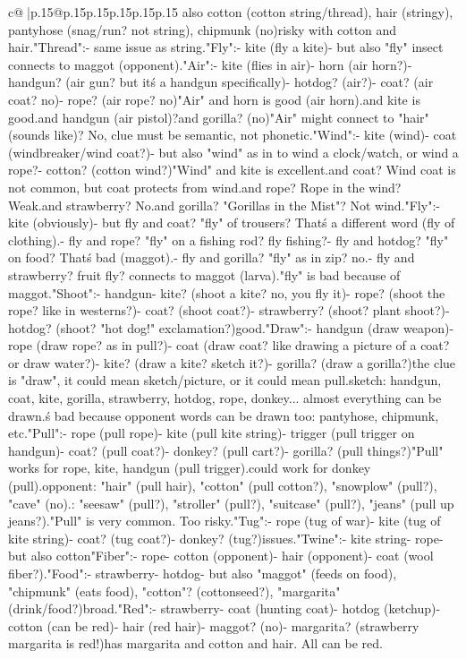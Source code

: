 \documentclass{article}
\begin{document}
{\begin{supertabular}{c@{$\;$}|p{.15\linewidth}@{}p{.15\linewidth}p{.15\linewidth}p{.15\linewidth}p{.15\linewidth}p{.15\linewidth}}
{{{also cotton (cotton string/thread), hair (stringy), pantyhose (snag/run? not string), chipmunk (no)\nToo risky with cotton and hair.\n\n"Thread":\n- same issue as string.\n\n"Fly":\n- kite (fly a kite)\n- but also "fly" insect connects to maggot (opponent).\n\n"Air":\n- kite (flies in air)\n- horn (air horn?)\n- handgun? (air gun? but it\'s a handgun specifically)\n- hotdog? (air?)\n- coat? (air coat? no)\n- rope? (air rope? no)\n"Air" and horn is good (air horn).\nAir and kite is good.\nAir and handgun (air pistol)?\nAir and gorilla? (no)\n"Air" might connect to "hair" (sounds like)? No, clue must be semantic, not phonetic.\n\n"Wind":\n- kite (wind)\n- coat (windbreaker/wind coat?)\n- but also "wind" as in to wind a clock/watch, or wind a rope?\n- cotton? (cotton wind?)\n"Wind" and kite is excellent.\nWind and coat? Wind coat is not common, but coat protects from wind.\nWind and rope? Rope in the wind? Weak.\nWind and strawberry? No.\nWind and gorilla? "Gorillas in the Mist"? Not wind.\n\n"Fly":\n- kite (obviously)\n- but fly and coat? "fly" of trousers? That\'s a different word (fly of clothing).\n- fly and rope? "fly" on a fishing rod? fly fishing?\n- fly and hotdog? "fly" on food? That\'s bad (maggot).\n- fly and gorilla? "fly" as in zip? no.\n- fly and strawberry? fruit fly? connects to maggot (larva).\nSo "fly" is bad because of maggot.\n\n"Shoot":\n- handgun\n- kite? (shoot a kite? no, you fly it)\n- rope? (shoot the rope? like in westerns?)\n- coat? (shoot coat?)\n- strawberry? (shoot? plant shoot?)\n- hotdog? (shoot? "hot dog!" exclamation?)\nNot good.\n\n"Draw":\n- handgun (draw weapon)\n- rope (draw rope? as in pull?)\n- coat (draw coat? like drawing a picture of a coat? or draw water?)\n- kite? (draw a kite? sketch it?)\n- gorilla? (draw a gorilla?)\nIf the clue is "draw", it could mean sketch/picture, or it could mean pull.\nIf sketch: handgun, coat, kite, gorilla, strawberry, hotdog, rope, donkey... almost everything can be drawn.\nThat\'s bad because opponent words can be drawn too: pantyhose, chipmunk, etc.\n\n"Pull":\n- rope (pull rope)\n- kite (pull kite string)\n- trigger (pull trigger on handgun)\n- coat? (pull coat?)\n- donkey? (pull cart?)\n- gorilla? (pull things?)\n"Pull" works for rope, kite, handgun (pull trigger).\nAlso could work for donkey (pull).\nBut opponent: "hair" (pull hair), "cotton" (pull cotton?), "snowplow" (pull?), "cave" (no).\nDistractors: "seesaw" (pull?), "stroller" (pull?), "suitcase" (pull?), "jeans" (pull up jeans?).\n"Pull" is very common. Too risky.\n\n"Tug":\n- rope (tug of war)\n- kite (tug of kite string)\n- coat? (tug coat?)\n- donkey? (tug?)\nSimilar issues.\n\n"Twine":\n- kite string\n- rope\n- but also cotton\n\n"Fiber":\n- rope\n- cotton (opponent)\n- hair (opponent)\n- coat (wool fiber?)\nBad.\n\n"Food":\n- strawberry\n- hotdog\n- but also "maggot" (feeds on food), "chipmunk" (eats food), "cotton"? (cottonseed?), "margarita" (drink/food?)\nToo broad.\n\n"Red":\n- strawberry\n- coat (hunting coat)\n- hotdog (ketchup)\n- cotton (can be red)\n- hair (red hair)\n- maggot? (no)\n- margarita? (strawberry margarita is red!)\nOpponent has margarita and cotton and hair. All can be red.\nToo }}}
\end{supertabular}}
\end{document}
